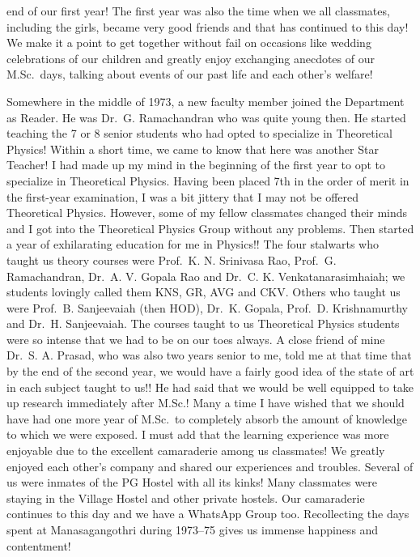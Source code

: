 end of our first year! The first year was also the time when we all classmates, including the girls, became very good friends and that has continued to this day! We make it a point to get together without fail on occasions like wedding celebrations of our children and greatly enjoy exchanging anecdotes of our M.Sc.\ days, talking about events of our past life and each other's welfare!
\vskip 2pt

Somewhere in the middle of 1973, a new faculty member joined the Department as Reader. He was Dr.\ G. Ramachandran who was quite young then. He started teaching the 7 or 8 senior students who had opted to specialize in Theoretical Physics! Within a short time, we came to know that here was another Star Teacher! I had made up my mind in the beginning of the first year to opt to specialize in Theoretical Physics. Having been placed 7th in the order of merit in the first-year examination, I was a bit jittery that I may not be offered Theoretical Physics. However, some of my fellow classmates changed their minds and I got into the Theoretical Physics Group without any problems. Then started a year of exhilarating education for me in Physics!! The four stalwarts who taught us theory courses were Prof.\ K. N. Srinivasa Rao, Prof.\ G. Ramachandran, Dr.\ A. V. Gopala Rao and Dr.\ C. K. Venkatanarasimhaiah; we students lovingly called them KNS, GR, AVG and CKV. Others who taught us were Prof.\ B. Sanjeevaiah (then HOD), Dr.\ K. Gopala, Prof.\ D. Krishnamurthy and Dr.\ H. Sanjeevaiah. The courses taught to us Theoretical Physics students were so intense that we had to be on our toes always. A close friend of mine Dr.\ S. A. Prasad, who was also two years senior to me, told me at that time that by the end of the second year, we would have a fairly good idea of the state of art in each subject taught to us!! He had said that we would be well equipped to take up research immediately after M.Sc.! Many a time I have wished that we should have had one more year of M.Sc.\ to completely absorb the amount of knowledge to which we were exposed. I must add that the learning experience was more enjoyable due to the excellent camaraderie among us classmates! We greatly enjoyed each other's company and shared our experiences and troubles. Several of us were inmates of the PG Hostel with all its kinks! Many classmates were staying in the Village Hostel and other private hostels. Our camaraderie continues to this day and we have a WhatsApp Group too. Recollecting the days spent at Manasagangothri during 1973--75 gives us immense happiness and contentment!
\vskip 2pt

